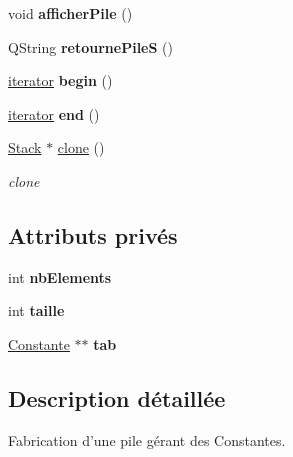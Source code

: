 \begin{DoxyCompactItemize}
\item 
\hypertarget{class_stack_aef7eba142243dda7ba09ddc2f53e72fb}{void {\bfseries afficher\-Pile} ()}\label{class_stack_aef7eba142243dda7ba09ddc2f53e72fb}

\item 
\hypertarget{class_stack_a8803f6b50bd662c27abc508a6a3f7fb3}{Q\-String {\bfseries retourne\-Pile\-S} ()}\label{class_stack_a8803f6b50bd662c27abc508a6a3f7fb3}

\item 
\hypertarget{class_stack_a50571f5f80f8124311b39498a007ac5c}{\hyperlink{class_stack_1_1iterator}{iterator} {\bfseries begin} ()}\label{class_stack_a50571f5f80f8124311b39498a007ac5c}

\item 
\hypertarget{class_stack_a02415f89ea8988765ae889fd9778541c}{\hyperlink{class_stack_1_1iterator}{iterator} {\bfseries end} ()}\label{class_stack_a02415f89ea8988765ae889fd9778541c}

\item 
\hyperlink{class_stack}{Stack} $\ast$ \hyperlink{class_stack_a2031a4e7e9d813a8b51c6498fe3180ae}{clone} ()
\begin{DoxyCompactList}\small\item\em clone \end{DoxyCompactList}\end{DoxyCompactItemize}
\subsection*{Attributs privés}
\begin{DoxyCompactItemize}
\item 
\hypertarget{class_stack_abd9c5154fe016302008572ace7794ade}{int {\bfseries nb\-Elements}}\label{class_stack_abd9c5154fe016302008572ace7794ade}

\item 
\hypertarget{class_stack_ad7a0d1b6ad7d0864bc3760e650208764}{int {\bfseries taille}}\label{class_stack_ad7a0d1b6ad7d0864bc3760e650208764}

\item 
\hypertarget{class_stack_a48a73ba47f398d9aaced05b8f292e2f3}{\hyperlink{class_calcul_1_1_constante}{Constante} $\ast$$\ast$ {\bfseries tab}}\label{class_stack_a48a73ba47f398d9aaced05b8f292e2f3}

\end{DoxyCompactItemize}


\subsection{Description détaillée}
Fabrication d'une pile gérant des Constantes. 

